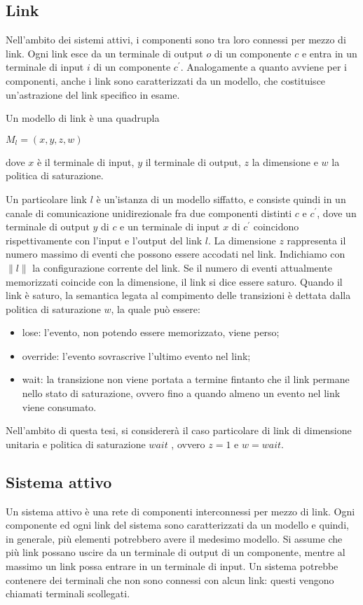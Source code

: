 \subsection{Link}
Nell'ambito dei sistemi attivi, i componenti sono tra loro connessi per mezzo di link. Ogni link esce da un terminale di output $o$ di un componente $c$ e entra in un terminale di input $i$ di un componente $c^\prime$.
Analogamente a quanto avviene per i componenti, anche i link sono caratterizzati da un modello, che costituisce un'astrazione del link specifico in esame.

\begin{defn}
Un modello di link è una quadrupla
\begin{center}
	$M_l = (x,y,z,w)$
\end{center}
dove $x$ è il terminale di input, $y$ il terminale di output, $z$ la dimensione e $w$ la politica di saturazione.
\end{defn}
Un particolare link $l$ è un'istanza di un modello siffatto, e consiste quindi in un canale di comunicazione unidirezionale fra due componenti distinti $c$ e $c^\prime$, dove un terminale di output $y$ di $c$ e un terminale di input $x$ di $c^\prime$ coincidono rispettivamente con l'input e l'output del link $l$.
La dimensione $z$ rappresenta il numero massimo di eventi che possono essere accodati nel link. 
Indichiamo con $\parallel l \parallel$ la configurazione corrente del link. 
Se il numero di eventi attualmente memorizzati coincide con la dimensione, il link si dice essere saturo.
Quando il link è saturo, la semantica legata al compimento delle transizioni è dettata dalla politica di saturazione $w$, la quale può essere:
\begin{itemize}
\item lose: l'evento, non potendo essere memorizzato, viene perso;
\item override: l'evento sovrascrive l'ultimo evento nel link;
\item wait: la transizione non viene portata a termine fintanto che il link permane nello stato di saturazione, ovvero fino a quando almeno un evento nel link viene consumato.
\end{itemize}
Nell'ambito di questa tesi, si considererà il caso particolare di link di dimensione unitaria e politica di saturazione $wait$ , ovvero $z = 1$ e $w = wait$.

\subsection{Sistema attivo}
Un sistema attivo è una rete di componenti interconnessi per mezzo di link. Ogni componente ed ogni link del sistema sono caratterizzati da un modello e quindi, in generale, più elementi potrebbero avere il medesimo modello. Si assume che più link possano uscire da un terminale di output di un componente, mentre al massimo un link possa entrare in un terminale di input.
Un sistema potrebbe contenere dei terminali che non sono connessi con alcun link: questi vengono chiamati terminali scollegati.


